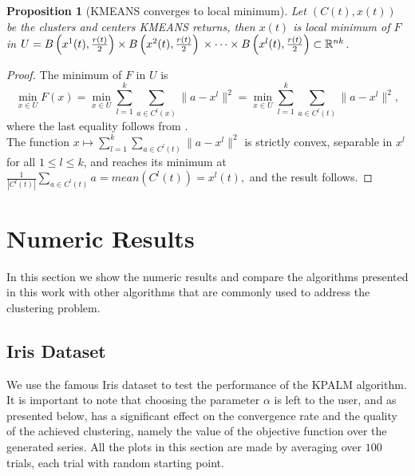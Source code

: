\documentclass[11pt]{article}
\numberwithin{equation}{section}
\newtheorem{proposition}{Proposition}[section]
\begin{document}
\begin{proposition}[KMEANS converges to local minimum]
Let $(C(t), x(t))$ be the clusters and centers KMEANS returns, then $x(t)$ is local minimum of $F$ in $U = B\left( x^1(t),\frac{r(t)}{2}\right) \times  B\left( x^2(t),\frac{r(t)}{2}\right) \\ \times \cdots \times B\left( x^l(t),\frac{r(t)}{2} \right) \subset \mathbb{R}^{nk}$.
\end{proposition}

\begin{proof}
The minimum of $F$ in $U$ is
\begin{equation*}
\min\limits_{x \in U} F(x) = \min\limits_{x \in U} \sum\limits_{l=1}^{k} \sum\limits_{a \in C^l(x)} \|a - x^l \|^2 = \min\limits_{x \in U} \sum\limits_{l=1}^{k} \sum\limits_{a \in C^l(t)} \|a - x^l \|^2 ,
\end{equation*}
where the last equality follows from .\\
The function $x \mapsto \sum\limits_{l=1}^{k} \sum\limits_{a \in C^l(t)} \|a - x^l \|^2$ is strictly convex, separable in $x^l$ for all $1 \leq l \leq k$, and reaches its minimum at $\frac{1}{\left| C^l(t) \right|} \sum\limits_{a \in C^l(t)} a = mean(C^l(t)) = x^l(t),$ and the result follows.
\end{proof}

\newpage

\section{Numeric Results}
In this section we show the numeric results and compare the algorithms presented in this work with other algorithms that are commonly used to address the clustering problem.

\subsection{Iris Dataset}
We use the famous Iris dataset to test the performance of the KPALM algorithm. It is important to note that choosing the parameter $\alpha$ is left to the user, and as presented below, has a significant effect on the convergence rate and the quality of the achieved clustering, namely the value of the objective function over the generated series. All the plots in this section are made by averaging over $100$ trials, each trial with random starting point.
\end{document}
